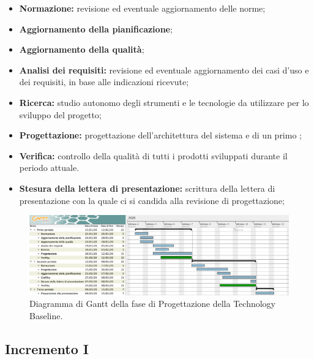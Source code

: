 					\begin{itemize}
					 	\item \textbf{Normazione:} revisione ed eventuale aggiornamento delle norme;
					 	\item \textbf{Aggiornamento della pianificazione};
					 	\item \textbf{Aggiornamento della qualità};
					 	\item \textbf{Analisi dei requisiti:} revisione ed eventuale aggiornamento dei casi d'uso e dei requisiti, in base alle indicazioni ricevute;
					 	\item \textbf{Ricerca:} studio autonomo degli strumenti e le tecnologie da utilizzare per lo sviluppo del progetto;
					 	\item \textbf{Progettazione:} progettazione dell'architettura del sistema e di un primo ;
					 	\item \textbf{Verifica:} controllo della qualità di tutti i prodotti sviluppati durante il periodo attuale.
					 	\item \textbf{Stesura della lettera di presentazione:} scrittura della lettera di presentazione con la quale ci si candida alla revisione di progettazione;
					\end{itemize} 	
		
        \begin{landscape}

          \begin{figure}[H]
            \centering
            \includegraphics[width=\linewidth]{images/ganttTechBase} %
            \caption{Diagramma di Gantt della fase di Progettazione della Technology Baseline.}
          \end{figure}

		\end{landscape}		



		\subsection{Incremento I}
			
